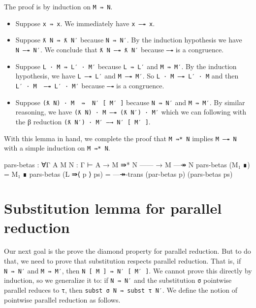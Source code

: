 The proof is by induction on \texttt{M\ ⇛\ N}.

\begin{itemize}
\item
  Suppose \texttt{x\ ⇛\ x}. We immediately have \texttt{x\ —↠\ x}.
\item
  Suppose \texttt{ƛ\ N\ ⇛\ ƛ\ N′} because \texttt{N\ ⇛\ N′}. By the
  induction hypothesis we have \texttt{N\ —↠\ N′}. We conclude that
  \texttt{ƛ\ N\ —↠\ ƛ\ N′} because \texttt{—↠} is a congruence.
\item
  Suppose \texttt{L\ ·\ M\ ⇛\ L′\ ·\ M′} because \texttt{L\ ⇛\ L′} and
  \texttt{M\ ⇛\ M′}. By the induction hypothesis, we have
  \texttt{L\ —↠\ L′} and \texttt{M\ —↠\ M′}. So
  \texttt{L\ ·\ M\ —↠\ L′\ ·\ M} and then
  \texttt{L′\ ·\ M\ \ —↠\ L′\ ·\ M′} because \texttt{—↠} is a
  congruence.
\item
  Suppose \texttt{(ƛ\ N)\ ·\ M\ \ ⇛\ \ N′\ {[}\ M′\ {]}} because
  \texttt{N\ ⇛\ N′} and \texttt{M\ ⇛\ M′}. By similar reasoning, we have
  \texttt{(ƛ\ N)\ ·\ M\ —↠\ (ƛ\ N′)\ ·\ M′} which we can following with
  the β reduction \texttt{(ƛ\ N′)\ ·\ M′\ —→\ N′\ {[}\ M′\ {]}}.
\end{itemize}

With this lemma in hand, we complete the proof that \texttt{M\ ⇛*\ N}
implies \texttt{M\ —↠\ N} with a simple induction on \texttt{M\ ⇛*\ N}.

\begin{fence}
\begin{code}
pars-betas : ∀{Γ A} {M N : Γ ⊢ A}
  → M ⇛* N
    ------
  → M —↠ N
pars-betas (M₁ ∎) = M₁ ∎
pars-betas (L ⇛⟨ p ⟩ ps) = —↠-trans (par-betas p) (pars-betas ps)
\end{code}
\end{fence}

\hypertarget{substitution-lemma-for-parallel-reduction}{%
\section{Substitution lemma for parallel
reduction}\label{substitution-lemma-for-parallel-reduction}}

Our next goal is the prove the diamond property for parallel reduction.
But to do that, we need to prove that substitution respects parallel
reduction. That is, if \texttt{N\ ⇛\ N′} and \texttt{M\ ⇛\ M′}, then
\texttt{N\ {[}\ M\ {]}\ ⇛\ N′\ {[}\ M′\ {]}}. We cannot prove this
directly by induction, so we generalize it to: if \texttt{N\ ⇛\ N′} and
the substitution \texttt{σ} pointwise parallel reduces to \texttt{τ},
then \texttt{subst\ σ\ N\ ⇛\ subst\ τ\ N′}. We define the notion of
pointwise parallel reduction as follows.


